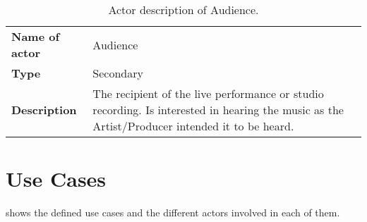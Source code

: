 \begin{table}[H]
	\centering
	\begin{tabularx}{\textwidth}{p{} X}
		\toprule
		\textbf{Name of actor} & Audience \\
		\textbf{Type} & Secondary \\
		\textbf{Description} & The recipient of the live performance or studio recording. Is interested in hearing the music as the Artist/Producer intended it to be heard. \\
		\bottomrule
	\end{tabularx}
	\caption{Actor description of Audience.}
	\label{tab:actorAudience}
\end{table}

\section{Use Cases}
\label{rap:UC}
 shows the defined use cases and the different actors involved in each of them.


